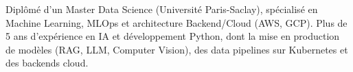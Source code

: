 

\begin{cvparagraph}

Diplômé d'un Master Data Science (Université Paris-Saclay), spécialisé en Machine Learning, MLOps et architecture Backend/\allowbreak Cloud (AWS, GCP). Plus de 5 ans d'expérience en IA et développement Python, dont la mise en production de modèles (RAG, LLM, Computer Vision), des data pipelines sur Kubernetes et des backends cloud.
\end{cvparagraph}
